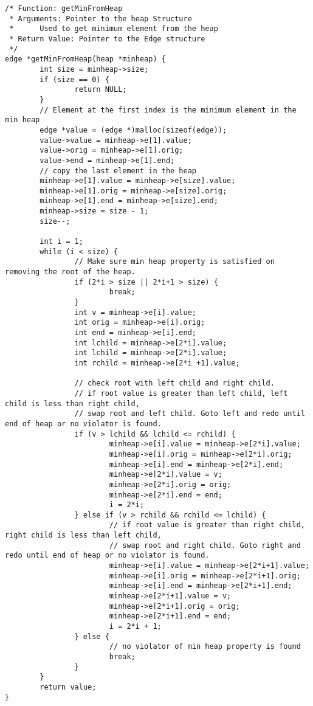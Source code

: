 \documentclass[a4paper]{article}
\begin{document}
\begin{lstlisting}
/* Function: getMinFromHeap
 * Arguments: Pointer to the heap Structure
 *      Used to get minimum element from the heap
 * Return Value: Pointer to the Edge structure
 */
edge *getMinFromHeap(heap *minheap) {
        int size = minheap->size;
        if (size == 0) {
                return NULL;
        }
        // Element at the first index is the minimum element in the min heap
        edge *value = (edge *)malloc(sizeof(edge));
        value->value = minheap->e[1].value;
        value->orig = minheap->e[1].orig;
        value->end = minheap->e[1].end;
        // copy the last element in the heap
        minheap->e[1].value = minheap->e[size].value;
        minheap->e[1].orig = minheap->e[size].orig;
        minheap->e[1].end = minheap->e[size].end;
        minheap->size = size - 1;
        size--;

        int i = 1;
        while (i < size) {
                // Make sure min heap property is satisfied on removing the root of the heap.
                if (2*i > size || 2*i+1 > size) {
                        break;
                }
                int v = minheap->e[i].value;
                int orig = minheap->e[i].orig;
                int end = minheap->e[i].end;
                int lchild = minheap->e[2*i].value;
                int lchild = minheap->e[2*i].value;
                int rchild = minheap->e[2*i +1].value;

                // check root with left child and right child.
                // if root value is greater than left child, left child is less than right child,
                // swap root and left child. Goto left and redo until end of heap or no violator is found.
                if (v > lchild && lchild <= rchild) {
                        minheap->e[i].value = minheap->e[2*i].value;
                        minheap->e[i].orig = minheap->e[2*i].orig;
                        minheap->e[i].end = minheap->e[2*i].end;
                        minheap->e[2*i].value = v;
                        minheap->e[2*i].orig = orig;
                        minheap->e[2*i].end = end;
                        i = 2*i;
                } else if (v > rchild && rchild <= lchild) {
                        // if root value is greater than right child, right child is less than left child,
                        // swap root and right child. Goto right and redo until end of heap or no violator is found.
                        minheap->e[i].value = minheap->e[2*i+1].value;
                        minheap->e[i].orig = minheap->e[2*i+1].orig;
                        minheap->e[i].end = minheap->e[2*i+1].end;
                        minheap->e[2*i+1].value = v;
                        minheap->e[2*i+1].orig = orig;
                        minheap->e[2*i+1].end = end;
                        i = 2*i + 1;
                } else {
                        // no violator of min heap property is found
                        break;
                }
        }
        return value;
}


\end{lstlisting}
\end{document}
